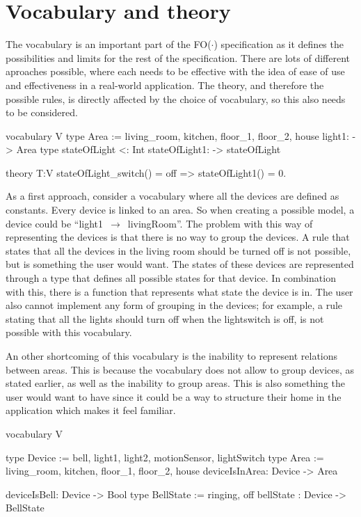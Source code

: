 \documentclass[11pt,a4paper]{report}
\newcommand{\fodot}{FO($\cdot$)\xspace}
\begin{document}
\section{Vocabulary and theory} 
The vocabulary is an important part of the \fodot specification as it defines the possibilities and limits for the rest of the specification. There are lots of different aproaches possible, where each needs to be effective with the idea of ease of use and effectiveness in a real-world application. The theory, and therefore the possible rules, is directly affected by the choice of vocabulary, so this also needs to be considered.

\begin{idplisting}
vocabulary V {
    type Area := {living_room, kitchen, floor_1, floor_2, house}
    light1: -> Area
    type stateOfLight <: Int
    stateOfLight1: -> stateOfLight
}

theory T:V {
    stateOfLight_switch() = off => stateOfLight1() = 0.
}
\end{idplisting}

As a first approach, consider a vocabulary where all the devices are defined as constants. Every device is linked to an area. So when creating a possible model, a device could be ``light1~$\rightarrow$~livingRoom''. The problem with this way of representing the devices is that there is no way to group the devices. A rule that states that all the devices in the living room should be turned off is not possible, but is something the user would want. The states of these devices are represented through a type that defines all possible states for that device. In combination with this, there is a function that represents what state the device is in. The user also cannot implement any form of grouping in the devices; for example, a rule stating that all the lights should turn off when the lightswitch is off, is not possible with this vocabulary.

An other shortcoming of this vocabulary is the inability to represent relations between areas. This is because the vocabulary does not allow to group devices, as stated earlier, as well as the inability to group areas. This is also something the user would want to have since it could be a way to structure their home in the application which makes it feel familiar.

\begin{idplisting}
vocabulary V {
    type Device := {bell, light1, light2, motionSensor, lightSwitch}
    type Area := {living_room, kitchen, floor_1, floor_2, house}
    deviceIsInArea: Device -> Area

    deviceIsBell: Device -> Bool
    type BellState := {ringing, off}
    bellState : Device -> BellState
}
\end{idplisting}
\end{document}
